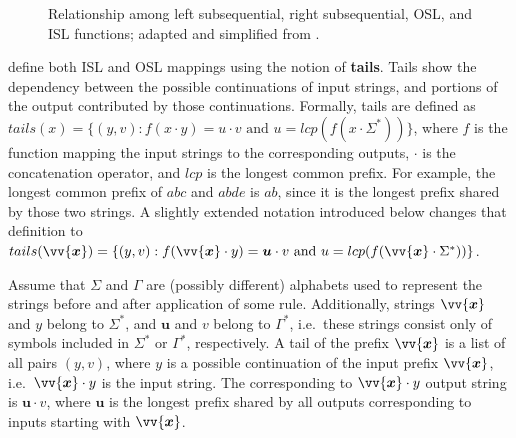 \begin{figure}[h!]
\begin{center}
\caption{Relationship among left subsequential, right subsequential, OSL, and ISL functions; adapted and simplified from \citep{Chandlee2014}.}
\label{fig:ssqfunctionsmanyy}
\end{center}
\end{figure}





\cite{ChandleeEtAl2014} define both ISL and OSL mappings using the notion of \textbf{tails}.
Tails show the dependency between the possible continuations of input strings, and portions of the output contributed by those continuations.
Formally, tails are defined as $tails(x) = \{(y, v) : f(x\cdot y) = u\cdot v \textrm{ and } u = lcp(f(x\cdot \Sigma^*))\}$, where $f$ is the function mapping the input strings to the corresponding outputs, $\cdot$ is the concatenation operator, and $lcp$ is the longest common prefix.
For example, the longest common prefix of $abc$ and $abde$ is $ab$, since it is the longest prefix shared by those two strings.
A slightly extended notation introduced below changes that definition to $tails(\vv{\bm{x}}) = \{(y, v) : f(\vv{\bm{x}}\cdot y) = \bm{u}\cdot v \textrm{ and } u = lcp(f(\vv{\bm{x}}\cdot \Sigma^*))\}$.



Assume that $\Sigma$ and $\Gamma$ are (possibly different) alphabets used to represent the strings before and after application of some rule.
Additionally, strings $\vv{\bm{x}}$ and $y$ belong to $\Sigma^*$, and $\bm{u}$ and $v$ belong to $\Gamma^*$, i.e.\ these strings consist only of symbols included in $\Sigma^*$ or $\Gamma^*$, respectively.
A tail of the prefix $\vv{\bm{x}}$ is a list of all pairs $(y, v)$, where $y$ is a possible continuation of the input prefix $\vv{\bm{x}}$, i.e.\ $\vv{\bm{x}}\cdot y$ is the input string.
The corresponding to $\vv{\bm{x}}\cdot y$ output string is $\bm{u}\cdot v$, where $\bm{u}$ is the longest prefix shared by all outputs corresponding to inputs starting with $\vv{\bm{x}}$.


